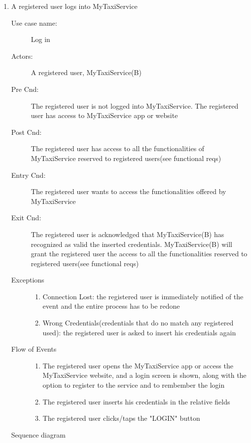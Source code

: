 \documentclass[11pt]{article} %
\begin{document}
\begin{enumerate}
	
	        \item A registered user logs into MyTaxiService
		\begin{description}
		        \item [Use case name:] Log in
		        \item [Actors:] A registered user, MyTaxiService(B)
		        \item [Pre Cnd:] The registered user is not logged into MyTaxiService. The registered
		        user has access to MyTaxiService app or website
		        \item [Post Cnd:] The registered user has access to all the functionalities of
		        MyTaxiService reserved to registered users(see functional reqs)
		        \item [Entry Cnd:] The registered user wants to access the functionalities offered by MyTaxiService
		        \item [Exit Cnd:]  The registered user is acknowledged that MyTaxiService(B) has recognized as valid the inserted
		        credentials. MyTaxiService(B) will grant the registered user the access to all the functionalities
		        reserved to registered users(see functional reqs)
		        \item [Exceptions]\hfill
			\begin{enumerate}
			          \item Connection Lost: the registered user is immediately notified of the event and the entire process
			          has to be redone
			          \item Wrong Credentials(credentials that do no match any registered used): the registered user is asked to insert his credentials again
			\end{enumerate}
		        \item [Flow of Events]\hfill
			\begin{enumerate}
			          \item The registered user opens the MyTaxiService app or access the MyTaxiService website, and a login
			          screen is shown, along with the option to register to the service and to rembember the login
			          \item The registered user inserts his credentials in the relative fields
			          \item The registered user clicks/taps the "LOGIN" button
			\end{enumerate}
		\end{description}
		Sequence diagram
		\begin{center}

\end{center}
\end{enumerate}
\end{document}
